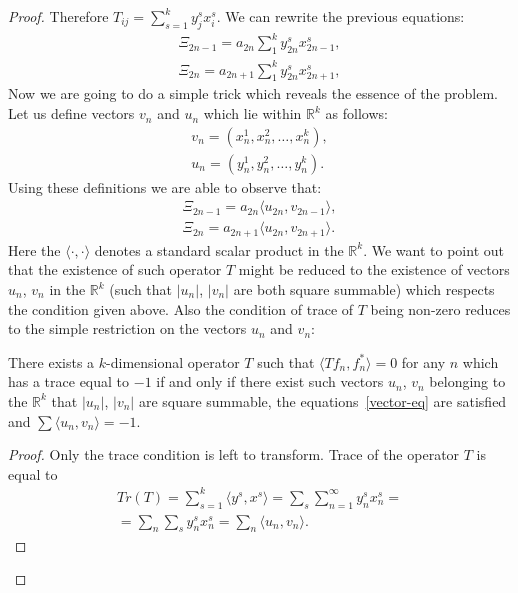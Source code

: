 \begin{proof}
    Therefore $T_{ij} = \sum_{s=1}^k {y^s_j x^s_i}$.
    We can rewrite the previous equations:
    \begin{align*}
      \Xi_{2n-1} = a_{2n} \sum_1^k y^s_{2n} x^s_{2n - 1},\\
      \Xi_{2n} = a_{2n + 1} \sum_1^k y^s_{2n} x^s_{2n + 1},
    \end{align*}
    Now we are going to do a simple trick which reveals the essence of the problem.
    Let us define vectors $v_n$ and $u_n$ which lie within $\mathbb{R}^k$ as follows:
    \begin{align*}
      v_n = (x^1_n, x^2_n, \dots ,x^k_n),\\
      u_n = (y^1_n, y^2_n, \dots ,y^k_n). 
    \end{align*}
    Using these definitions we are able to observe that:
    \begin{align}
      \label{vector-eq}
      \Xi_{2n-1} = a_{2n} \langle u_{2n}, v_{2n - 1}\rangle,\\
      \Xi_{2n} = a_{2n + 1} \langle u_{2n}, v_{2n + 1}\rangle.
    \end{align}
    Here the $\langle\cdot, \cdot\rangle$ denotes a standard scalar product in the $\mathbb{R}^k$.
    We want to point out that the existence of such operator $T$
      might be reduced to the existence of vectors $u_n$, $v_n$ in the $\mathbb{R}^k$ (such that $|u_n|$, $|v_n|$ are both square summable) which respects the condition given above.
    Also the condition of trace of $T$ being non-zero reduces to the simple restriction on the vectors $u_n$ and $v_n$:
    \begin{prop}
      There exists a $k$-dimensional operator $T$ such that $\langle Tf_n, f_n^*\rangle  = 0$ for any $n$
      which has a trace equal to $-1$ if and only if there exist such vectors $u_n$, $v_n$ belonging to the
      $\mathbb{R}^k$ that $|u_n|$, $|v_n|$ are square summable, the equations~\eqref{vector-eq} are satisfied and
      $\sum \langle u_n,v_n \rangle = -1$. 
    \end{prop}
    \begin{proof}
      Only the trace condition is left to transform.
      Trace of the operator $T$ is equal to
      \begin{multline*}
        Tr(T) = \sum_{s=1}^k \langle y^s, x^s \rangle = \sum_s \sum_{n=1}^\infty y^s_n x^s_n =\\
              = \sum_n \sum_s y^s_n x^s_n = \sum_n \langle u_n, v_n \rangle.
      \end{multline*}
    \end{proof}

\end{proof}
